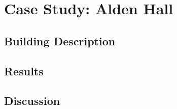 \chapter{Case Study: Alden Hall}
\section{Building Description}
\section{Results}
\section{Discussion}